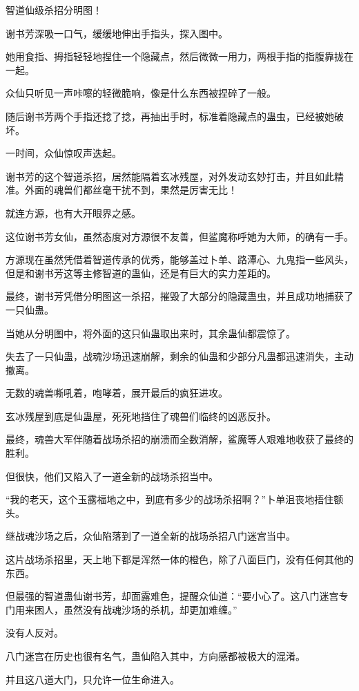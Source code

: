 \begin{this_body}
智道仙级杀招分明图！

谢书芳深吸一口气，缓缓地伸出手指头，探入图中。

她用食指、拇指轻轻地捏住一个隐藏点，然后微微一用力，两根手指的指腹靠拢在一起。

众仙只听见一声咔嚓的轻微脆响，像是什么东西被捏碎了一般。

随后谢书芳两个手指还捻了捻，再抽出手时，标准着隐藏点的蛊虫，已经被她破坏。

一时间，众仙惊叹声迭起。

谢书芳的这个智道杀招，居然能隔着玄冰残屋，对外发动玄妙打击，并且如此精准。外面的魂兽们都丝毫干扰不到，果然是厉害无比！

就连方源，也有大开眼界之感。

这位谢书芳女仙，虽然态度对方源很不友善，但鲨魔称呼她为大师，的确有一手。

方源现在虽然凭借着智道传承的优秀，能够盖过卜单、路潭心、九鬼指一些风头，但是和谢书芳这等主修智道的蛊仙，还是有巨大的实力差距的。

最终，谢书芳凭借分明图这一杀招，摧毁了大部分的隐藏蛊虫，并且成功地捕获了一只仙蛊。

当她从分明图中，将外面的这只仙蛊取出来时，其余蛊仙都震惊了。

失去了一只仙蛊，战魂沙场迅速崩解，剩余的仙蛊和少部分凡蛊都迅速消失，主动撤离。

无数的魂兽嘶吼着，咆哮着，展开最后的疯狂进攻。

玄冰残屋到底是仙蛊屋，死死地挡住了魂兽们临终的凶恶反扑。

最终，魂兽大军伴随着战场杀招的崩溃而全数消解，鲨魔等人艰难地收获了最终的胜利。

但很快，他们又陷入了一道全新的战场杀招当中。

“我的老天，这个玉露福地之中，到底有多少的战场杀招啊？”卜单沮丧地捂住额头。

继战魂沙场之后，众仙陷落到了一道全新的战场杀招八门迷宫当中。

这片战场杀招里，天上地下都是浑然一体的橙色，除了八面巨门，没有任何其他的东西。

但最强的智道蛊仙谢书芳，却面露难色，提醒众仙道：“要小心了。这八门迷宫专门用来困人，虽然没有战魂沙场的杀机，却更加难缠。”

没有人反对。

八门迷宫在历史也很有名气，蛊仙陷入其中，方向感都被极大的混淆。

并且这八道大门，只允许一位生命进入。


\end{this_body}
